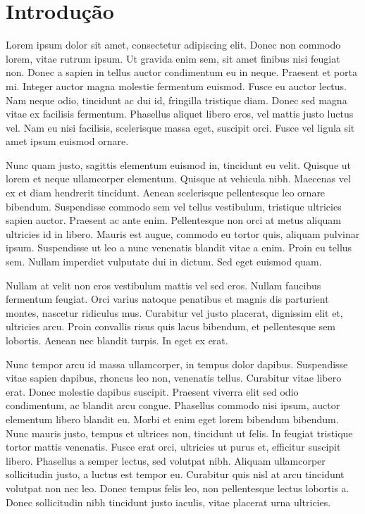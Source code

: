 \section{Introdução}
Lorem ipsum dolor sit amet, consectetur adipiscing elit. Donec non commodo lorem, vitae rutrum ipsum. Ut gravida enim sem, sit amet finibus nisi feugiat non. Donec a sapien in tellus auctor condimentum eu in neque. Praesent et porta mi. Integer auctor magna molestie fermentum euismod. Fusce eu auctor lectus. Nam neque odio, tincidunt ac dui id, fringilla tristique diam. Donec sed magna vitae ex facilisis fermentum. Phasellus aliquet libero eros, vel mattis justo luctus vel. Nam eu nisi facilisis, scelerisque massa eget, suscipit orci. Fusce vel ligula sit amet ipsum euismod ornare.

Nunc quam justo, sagittis elementum euismod in, tincidunt eu velit. Quisque ut lorem et neque ullamcorper elementum. Quisque at vehicula nibh. Maecenas vel ex et diam hendrerit tincidunt. Aenean scelerisque pellentesque leo ornare bibendum. Suspendisse commodo sem vel tellus vestibulum, tristique ultricies sapien auctor. Praesent ac ante enim. Pellentesque non orci at metus aliquam ultricies id in libero. Mauris est augue, commodo eu tortor quis, aliquam pulvinar ipsum. Suspendisse ut leo a nunc venenatis blandit vitae a enim. Proin eu tellus sem. Nullam imperdiet vulputate dui in dictum. Sed eget euismod quam.

Nullam at velit non eros vestibulum mattis vel sed eros. Nullam faucibus fermentum feugiat. Orci varius natoque penatibus et magnis dis parturient montes, nascetur ridiculus mus. Curabitur vel justo placerat, dignissim elit et, ultricies arcu. Proin convallis risus quis lacus bibendum, et pellentesque sem lobortis. Aenean nec blandit turpis. In eget ex erat.

Nunc tempor arcu id massa ullamcorper, in tempus dolor dapibus. Suspendisse vitae sapien dapibus, rhoncus leo non, venenatis tellus. Curabitur vitae libero erat. Donec molestie dapibus suscipit. Praesent viverra elit sed odio condimentum, ac blandit arcu congue. Phasellus commodo nisi ipsum, auctor elementum libero blandit eu. Morbi et enim eget lorem bibendum bibendum. Nunc mauris justo, tempus et ultrices non, tincidunt ut felis. In feugiat tristique tortor mattis venenatis. Fusce erat orci, ultricies ut purus et, efficitur suscipit libero. Phasellus a semper lectus, sed volutpat nibh. Aliquam ullamcorper sollicitudin justo, a luctus est tempor eu. Curabitur quis nisl at arcu tincidunt volutpat non nec leo. Donec tempus felis leo, non pellentesque lectus lobortis a. Donec sollicitudin nibh tincidunt justo iaculis, vitae placerat urna ultricies.

